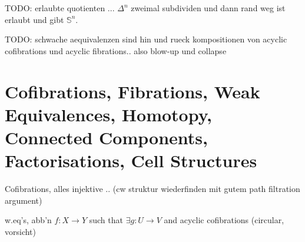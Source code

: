 \documentclass[a4paper]{book}
\theoremstyle{definition}
\renewcommand{\S}{\mathbb{S}}
\begin{document}


TODO: erlaubte quotienten ... $\Delta^n$ zweimal subdividen und dann rand weg ist erlaubt und gibt $\S^n$.

TODO: schwache aequivalenzen sind hin und rueck kompositionen von acyclic cofibrations und acyclic fibrations.. also blow-up und collapse

\section{Cofibrations, Fibrations, Weak Equivalences, Homotopy, Connected Components, Factorisations, Cell Structures}

Cofibrations, alles injektive .. (cw struktur wiederfinden mit gutem path filtration argument)

w.eq's, abb'n $f\colon X\rightarrow Y$ such that $\exists g\colon U \rightarrow V$ and acyclic cofibrations (circular, vorsicht)
\end{document}
